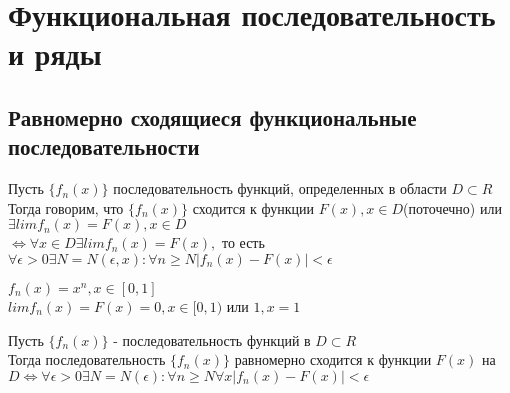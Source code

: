 \chapter{Функциональная последовательность и ряды}

\section{Равномерно сходящиеся функциональные последовательности}

\begin{Def}
	Пусть $\{f_n(x)\}$ последовательность функций, определенных в области $D \subset R$\\
	Тогда говорим, что $\{f_n(x)\}$ сходится к функции $F(x), x \in D$(поточечно) или $\exists lim f_n(x) = F(x), x \in D$\\
	$\Leftrightarrow \forall x \in D \exists lim f_n(x) = F(x),$ то есть $\forall \epsilon > 0 \exists N = N(\epsilon, x) : \forall n \geq N |f_n(x) - F(x)| < \epsilon$\\
\end{Def}

\begin{Example}
	$f_n(x) = x^n, x \in [0, 1]$\\
	$lim f_n(x) = F(x) = 0, x \in [0, 1)$ или $1, x = 1$\\
\end{Example}

\begin{Def}
	Пусть $\{f_n(x)\}$ - последовательность функций в $D \subset R$\\
	Тогда последовательность $\{f_n(x)\}$ равномерно сходится к функции $F(x)$ на $D \Leftrightarrow \forall \epsilon > 0 \exists N = N(\epsilon) : \forall n \geq N \forall x|f_n(x) - F(x)| < \epsilon$\\
\end{Def}
